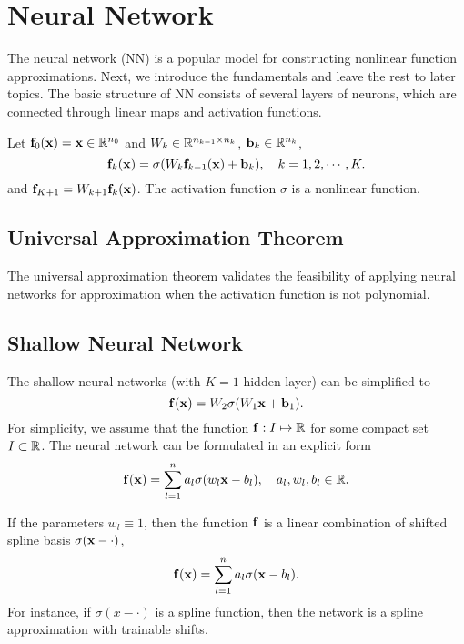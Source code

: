 \section{Neural Network}
The neural network (NN) is a popular model for constructing nonlinear function approximations. Next, we introduce the fundamentals and leave the rest to later topics. The basic structure of NN consists of several layers of neurons, which are connected through linear maps and activation functions. 

\begin{example}
Let $\mathbf f_0(\mathbf x) = \mathbf x\in \mathbb R^{n_0}$ and $W_k\in \mathbb R^{n_{k-1}\times n_k}$, $\mathbf b_k \in \mathbb R^{n_k}$, 
\begin{equation}
    \mathbf f_k(\mathbf x) = \sigma(W_k \mathbf f_{k-1}(\mathbf x) + \mathbf b_k) , \quad k=1, 2,\cdots, K.
\end{equation}
and
$\mathbf f_{K+1} = W_{k+1} \mathbf f_k(\mathbf x)$. 
The activation function $\sigma$ is a nonlinear function. 
\end{example}
\subsection{Universal Approximation Theorem}
The universal approximation theorem validates the feasibility of applying neural networks for approximation when the activation function is not polynomial. 
\subsection{Shallow Neural Network}
The shallow neural networks (with $K=1$ hidden layer) can be simplified to 
\begin{equation}
    \mathbf f(\mathbf x) = W_{2}\sigma(W_1 \mathbf x + \mathbf b_1).
\end{equation}
For simplicity, we assume that the function $\mathbf f: I\mapsto \mathbb R$ for some compact set $I\subset \mathbb R$. The neural network can be formulated in an explicit form 
\begin{equation}
    \mathbf f(\mathbf x) = \sum_{l=1}^n a_l \sigma(w_l \mathbf x - b_l),\quad a_l, w_l, b_l\in\mathbb R.
\end{equation}
\begin{example}
    If the parameters $w_l\equiv 1$, then the function $\mathbf f$ is a linear combination of shifted spline basis $\sigma(\mathbf x -\cdot)$, 
    \begin{equation}
     \mathbf f(\mathbf x) = \sum_{l=1}^n a_l \sigma(\mathbf x - b_l).
    \end{equation}
    For instance, if $\sigma(x - \cdot)$ is a spline function, then the network is a spline approximation with trainable shifts.
\end{example}

